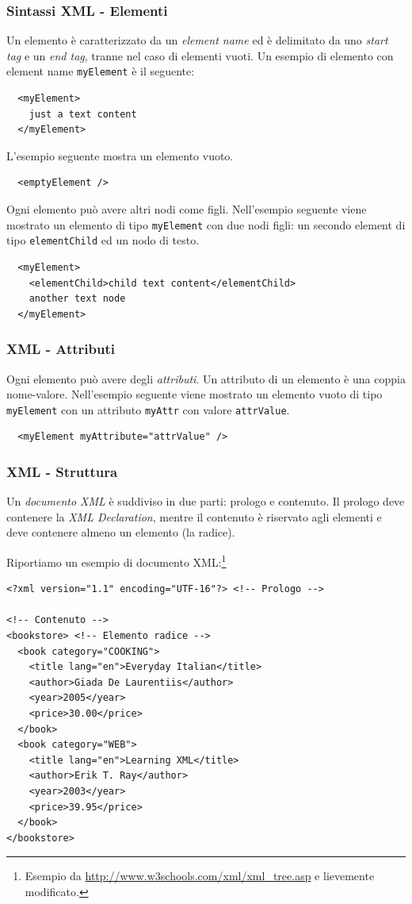 \documentclass[8pt]{beamer}
\begin{document}
\begin{frame}[fragile]
 \frametitle{Sintassi XML - Elementi}

 
 Un elemento \`e caratterizzato da un \emph{element name}
 ed \`e delimitato da uno \emph{start tag} e un \emph{end tag},
 tranne nel caso di elementi vuoti.
 Un esempio di elemento con element name \texttt{myElement} \`e
 il seguente:
\begin{verbatim}
  <myElement>
    just a text content
  </myElement>
\end{verbatim}

 L'esempio seguente mostra un elemento vuoto.
\begin{verbatim}
  <emptyElement />
\end{verbatim}
  
 Ogni elemento pu\`o avere altri nodi come figli.
 Nell'esempio seguente viene mostrato un elemento 
 di tipo \texttt{myElement} con due nodi figli:
 un secondo element di tipo \texttt{elementChild}
 ed un nodo di testo.
\begin{verbatim}
  <myElement>
    <elementChild>child text content</elementChild>
    another text node
  </myElement>
\end{verbatim}
\end{frame}

\begin{frame}[fragile]
 \frametitle{XML - Attributi}
 Ogni elemento pu\`o avere degli \emph{attributi}.
 Un attributo di un elemento \`e una coppia nome-valore. 
 Nell'esempio seguente viene mostrato un elemento vuoto 
 di tipo \texttt{myElement} con un attributo \texttt{myAttr} 
 con valore \texttt{attrValue}.
\begin{verbatim}
  <myElement myAttribute="attrValue" />
\end{verbatim}
\end{frame}

\begin{frame}[fragile]
 \frametitle{XML - Struttura}
 Un \emph{documento XML} \`e suddiviso in due parti: prologo e 
 contenuto. Il prologo deve contenere la \emph{XML Declaration},
 mentre il contenuto \`e riservato agli elementi e deve contenere
 almeno un elemento (la radice).
 \vspace{\baselineskip}

 Riportiamo un esempio di documento XML:\footnote{Esempio da \url{http://www.w3schools.com/xml/xml_tree.asp} e lievemente modificato.}
\begin{small}
\begin{verbatim}
<?xml version="1.1" encoding="UTF-16"?> <!-- Prologo -->

<!-- Contenuto -->
<bookstore> <!-- Elemento radice -->
  <book category="COOKING">
    <title lang="en">Everyday Italian</title>
    <author>Giada De Laurentiis</author>
    <year>2005</year>
    <price>30.00</price>
  </book>
  <book category="WEB">
    <title lang="en">Learning XML</title>
    <author>Erik T. Ray</author>
    <year>2003</year>
    <price>39.95</price>
  </book>
</bookstore> 
\end{verbatim}
\end{small}
\end{frame}
\end{document}
